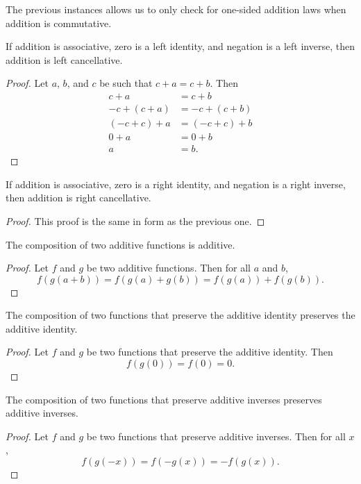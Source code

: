 \documentclass[../../math.tex]{subfiles}
\begin{document}
The previous instances allows us to only check for one-sided addition laws when
addition is commutative.

\begin{instance} \label{plus_linv_lcancel}
    If addition is associative, zero is a left identity, and negation is a left
    inverse, then addition is left cancellative.
\end{instance}
\begin{proof}
    Let $a$, $b$, and $c$ be such that $c + a = c + b$.  Then
    \begin{align*}
        c + a &= c + b \\
        -c + (c + a) &= -c + (c + b) \\
        (-c + c) + a &= (-c + c) + b \\
        0 + a &= 0 + b \\
        a &= b.
    \end{align*}
\end{proof}

\begin{instance} \label{plus_rinv_rcancel}
    If addition is associative, zero is a right identity, and negation is a
    right inverse, then addition is right cancellative.
\end{instance}
\begin{proof}
    This proof is the same in form as the previous one.
\end{proof}

\begin{instance}
    The composition of two additive functions is additive.
\end{instance}
\begin{proof}
    Let $f$ and $g$ be two additive functions.  Then for all $a$ and $b$,
    \[
        f(g(a + b)) = f(g(a) + g(b)) = f(g(a)) + f(g(b)).
    \]
\end{proof}

\begin{instance}
    The composition of two functions that preserve the additive identity
    preserves the additive identity.
\end{instance}
\begin{proof}
    Let $f$ and $g$ be two functions that preserve the additive identity.  Then
    \[
        f(g(0)) = f(0) = 0.
    \]
\end{proof}

\begin{instance}
    The composition of two functions that preserve additive inverses preserves
    additive inverses.
\end{instance}
\begin{proof}
    Let $f$ and $g$ be two functions that preserve additive inverses.  Then for
    all $x$,
    \[
        f(g(-x)) = f(-g(x)) = -f(g(x)).
    \]
\end{proof}
\end{document}
